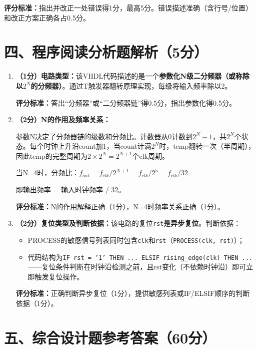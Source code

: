 \textbf{评分标准：}指出并改正一处错误得1分，最高5分。错误描述准确（含行号/位置）和改正方案正确各占0.5分。

\section{四、程序阅读分析题解析（5分）}

\begin{enumerate}[label=(\arabic*), leftmargin=*]

\item \textbf{（1分）电路类型：}该VHDL代码描述的是一个\textbf{参数化N级二分频器（或称除以$2^N$的分频器）}。通过T触发器翻转原理实现，每级将输入频率除以2。

\textbf{评分标准：}答出“分频器”或“二分频器链”得0.5分，指出参数化得0.5分。

\item \textbf{（2分）N的作用及频率关系：}

参数N决定了分频器链的级数和分频比。计数器从0计数到$2^N-1$，共$2^N$个状态。每个时钟上升沿count加1，当count计满$2^N$时，temp翻转一次（半周期），因此temp的完整周期为$2 \times 2^N = 2^{N+1}$个clk周期。

当N=4时，分频比：$f_{out} = f_{clk} / 2^{N+1} = f_{clk} / 2^5 = f_{clk} / 32$

即输出频率 = 输入时钟频率 / 32。

\textbf{评分标准：}N的作用解释正确（1分），N=4时频率关系正确（1分）。

\item \textbf{（2分）复位类型及判断依据：}该电路的复位\texttt{rst}是\textbf{异步复位}。判断依据：
\begin{itemize}
  \item PROCESS的敏感信号列表同时包含\texttt{clk}和\texttt{rst}（\texttt{PROCESS(clk, rst)}）；
  \item 代码结构为\texttt{IF rst = '1' THEN ... ELSIF rising\_edge(clk) THEN ...}——复位条件判断在时钟沿检测之前，且rst变化（不依赖时钟沿）即可立即触发复位操作。
\end{itemize}

\textbf{评分标准：}正确判断异步复位（1分），提供敏感列表或IF/ELSIF顺序的判断依据（1分）。

\end{enumerate}

\section{五、综合设计题参考答案（60分）}

